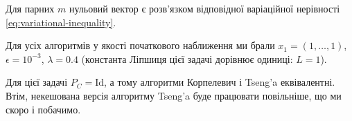 \begin{problem}
    Для парних $m$ нульовий вектор є розв'язком відповідної варіаційної нерівності \eqref{eq:variational-inequality}. \medskip
    
    Для усіх алгоритмів у якості початкового наближення ми брали $x_1 = (1, \dots, 1)$, $\epsilon = 10^{-3}$, $\lambda = 0.4$ (константа Ліпшиця цієї задачі дорівнює одиниці: $L = 1$). 
\end{problem}

\begin{remark}
    Для цієї задачі $P_C = \text{Id}$, а тому алгоритми Корпелевич і Tseng'a еквівалентні. Втім, некешована версія алгоритму Tseng'a буде працювати повільніше, що ми скоро і побачимо.
\end{remark}
